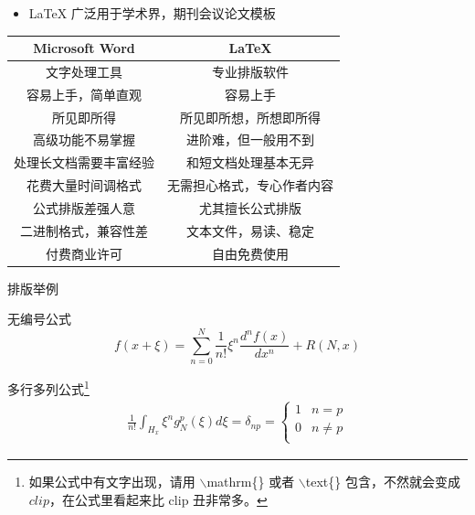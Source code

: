 \documentclass{beamer}
\begin{document}
\begin{frame}
	\begin{itemize}
		\item \LaTeX{} 广泛用于学术界，期刊会议论文模板
	\end{itemize}
	\begin{table}[h]
		\centering
		\begin{tabular}{c|c}
			Microsoft Word & \LaTeX{}      \\
			\hline
			文字处理工具         & 专业排版软件        \\
			容易上手，简单直观      & 容易上手          \\
			所见即所得          & 所见即所想，所想即所得   \\
			高级功能不易掌握       & 进阶难，但一般用不到    \\
			处理长文档需要丰富经验    & 和短文档处理基本无异    \\
			花费大量时间调格式      & 无需担心格式，专心作者内容 \\
			公式排版差强人意       & 尤其擅长公式排版      \\
			二进制格式，兼容性差     & 文本文件，易读、稳定    \\
			付费商业许可         & 自由免费使用        \\
		\end{tabular}
	\end{table}
\end{frame}

\begin{frame}{排版举例}
	\begin{exampleblock}{无编号公式} %
		\begin{equation*}
			f(x+\xi)=\sum_{n=0}^{N}\frac{1}{n!}\xi^n\frac{d^nf(x)}{dx^n}+R(N,x)
			\label{equ-1}
		\end{equation*}
	\end{exampleblock}

	\begin{exampleblock}{多行多列公式\footnote{\tiny {如果公式中有文字出现，请用 $\backslash$mathrm\{\} 或者 $\backslash$text\{\} 包含，不然就会变成 $clip$，在公式里看起来比 $\mathrm{clip}$ 丑非常多。}}}
		\begin{align}
			\frac{1}{n!}\int_{H_x}\xi^ng_N^p(\xi)d\xi=\delta_{np}=
			\begin{cases}
				1 & n=p     \\
				0 & n\neq p \\
			\end{cases}
			\label{equ-2}
		\end{align}
	\end{exampleblock}
\end{frame}
\end{document}
